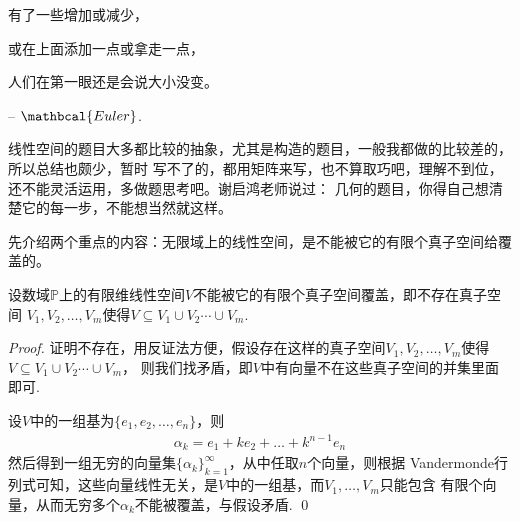 \begin{introduction}
	\item 有了一些增加或减少，
	\item 或在上面添加一点或拿走一点，
	\item 人们在第一眼还是会说大小没变。
	\item -- $\mathbcal{Euler}$.
\end{introduction}

线性空间的题目大多都比较的抽象，尤其是构造的题目，一般我都做的比较差的，所以总结也颇少，暂时
写不了的，都用矩阵来写，也不算取巧吧，理解不到位，还不能灵活运用，多做题思考吧。谢启鸿老师说过：
几何的题目，你得自己想清楚它的每一步，不能想当然就这样。

先介绍两个重点的内容：无限域上的线性空间，是不能被它的有限个真子空间给覆盖的。

\begin{proposition}[有限子覆盖]
	设数域$\mathbb{P}$上的有限维线性空间$V$不能被它的有限个真子空间覆盖，即不存在真子空间
	$V_1, V_2, \dots, V_m$使得$V \subseteq V_1 \cup  V_2 \cdots \cup  V_m$.
\end{proposition}

\begin{proof}
	证明不存在，用反证法方便，假设存在这样的真子空间$V_1, V_2, \dots, V_m$使得$V \subseteq V_1 \cup  V_2 \cdots \cup  V_m$，
	则我们找矛盾，即$V$中有向量不在这些真子空间的并集里面即可.

	设$V$中的一组基为$\{ e_1, e_2, \dots, e_n \}$，则
	\begin{align*}
		\alpha_k = e_1 + k e_2 + \dots + k^{n-1} e_n
	\end{align*}
	然后得到一组无穷的向量集$\{ \alpha_k \}_{k=1}^\infty$，从中任取$n$个向量，则根据
	Vandermonde行列式可知，这些向量线性无关，是$V$中的一组基，而$V_1,\dots,V_m$只能包含
	有限个向量，从而无穷多个$\alpha_k$不能被覆盖，与假设矛盾. 
	\qed{}
\end{proof}